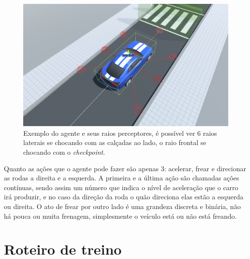  \begin{figure}[h]
   \centering
   \includegraphics[scale=0.35]{figs/agente-raios-checkpoint.png}
    \caption{Exemplo do agente e seus raios perceptores, é possível ver 6 raios laterais se chocando com as calçadas ao lado, o raio frontal se chocando com o \textit{checkpoint}.}
 \end{figure}

 Quanto as ações que o agente pode fazer são apenas 3: acelerar, frear e direcionar as rodas a direita e a esquerda. A primeira e a última ação são chamadas ações contínuas, sendo assim um número que indica o nível de aceleração que o carro irá produzir, e no caso da direção da roda o quão direciona elas estão a esquerda ou direita. O ato de frear por outro lado é uma grandeza discreta e binária, não há pouca ou muita frenagem, simplesmente o veículo está ou não está freando.

 \section{Roteiro de treino}
 